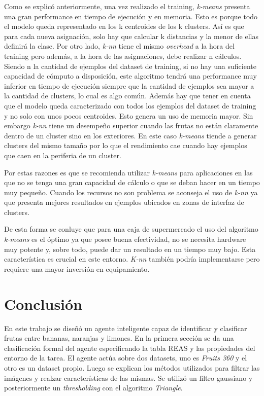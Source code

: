 \documentclass[10pt, a4paper]{article}
\begin{document}
Como se explicó anteriormente, una vez realizado el training, \textit{k-means} presenta una gran performance en tiempo de ejecución y en memoria. Esto es porque todo el modelo queda representado en los k centroides de los k clusters. Así es que para cada nueva asignación, solo hay que calcular k distancias y la menor de ellas definirá la clase. Por otro lado, \textit{k-nn} tiene el mismo \textit{overhead} a la hora del training pero además, a la hora de las asignaciones, debe realizar n cálculos. Siendo n la cantidad de ejemplos del dataset de training, si no hay una suficiente capacidad de cómputo a disposición, este algoritmo tendrá una performance muy inferior en tiempo de ejecución siempre que la cantidad de ejemplos sea mayor a la cantidad de clusters, lo cual es algo común. Además hay que tener en cuenta que el modelo queda caracterizado con todos los ejemplos del dataset de training y no solo con unos pocos centroides. Esto genera un uso de memoria mayor. Sin embargo \textit{k-nn} tiene un desempeño superior cuando las frutas no están claramente dentro de un cluster sino en los exteriores. En este caso \textit{k-means} tiende a generar clusters del mismo tamaño por lo que el rendimiento cae cuando hay ejemplos que caen en la periferia de un cluster. 

Por estas razones es que se recomienda utilizar \textit{k-means} para aplicaciones en las que no se tenga una gran capacidad de cálculo o que se deban hacer en un tiempo muy pequeño. Cuando los recursos no son problema se aconseja el uso de \textit{k-nn} ya que presenta mejores resultados en ejemplos ubicados en zonas de interfaz de clusters.

De esta forma se conluye que para una caja de supermercado el uso del algoritmo \textit{k-means} es el óptimo ya que posee buena efectividad, no se necesita hardware muy potente y, sobre todo, puede dar un resultado en un tiempo muy bajo. Esta característica es crucial en este entorno. \textit{K-nn} también podría implementarse pero requiere una mayor inversión en equipamiento. 

\section{Conclusión}

En este trabajo se diseñó un agente inteligente capaz de identificar y clasificar frutas entre bananas, naranjas y limones. En la primera sección se da una clasificación formal del agente especificando la tabla REAS y las propiedades del entorno de la tarea. El agente actúa sobre dos datasets, uno es \textit{Fruits 360} y el otro es un dataset propio. Luego se explican los métodos utilizados para filtrar las imágenes y realzar características de las mismas. Se utilizó un filtro gaussiano y posteriormente un \textit{thresholding} con el algoritmo \textit{Triangle}.
\end{document}
